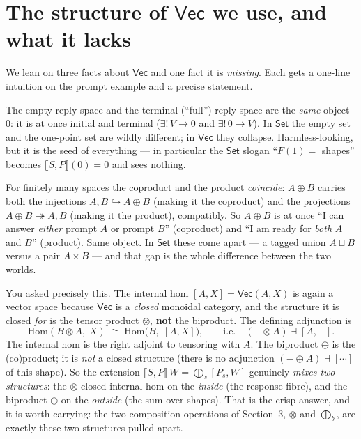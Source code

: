 \documentclass[11pt]{article}
\providecommand{\Vec}{}\renewcommand{\Vec}{\mathsf{Vec}}
\newcommand{\Set}{\mathsf{Set}}
\newcommand{\Hom}{\mathrm{Hom}}
\newcommand{\ext}[1]{\llbracket #1 \rrbracket}
\newcommand{\ihom}[2]{[#1,#2]}
\begin{document}
\section{The structure of $\Vec$ we use, and what it lacks}

We lean on three facts about $\Vec$ and one fact it is \emph{missing}. Each gets a
one-line intuition on the prompt example and a precise statement.

\begin{description}[leftmargin=1.3em,style=nextline]
\item[The zero object.] The empty reply space and the terminal (``full'') reply space
  are the \emph{same} object $0$: it is at once initial and terminal
  ($\exists!\,V\to 0$ and $\exists!\,0\to V$). In $\Set$ the empty set and the
  one-point set are wildly different; in $\Vec$ they collapse. Harmless-looking, but
  it is the seed of everything --- in particular the $\Set$ slogan ``$F(1)=$ shapes''
  becomes $\ext{S,P}(0)=0$ and sees nothing.

\item[The biproduct $A\oplus B$ --- the cleanest hook.] For finitely many spaces the
  coproduct and the product \emph{coincide}: $A\oplus B$ carries both the injections
  $A,B\hookrightarrow A\oplus B$ (making it the coproduct) and the projections
  $A\oplus B\twoheadrightarrow A,B$ (making it the product), compatibly. So $A\oplus B$
  is at once ``I can answer \emph{either} prompt $A$ or prompt $B$'' (coproduct) and
  ``I am ready for \emph{both} $A$ and $B$'' (product). Same object. In $\Set$ these
  come apart --- a tagged union $A\sqcup B$ versus a pair $A\times B$ --- and that gap
  is the whole difference between the two worlds.

\item[(B) $\Vec$ is closed --- with respect to $\otimes$, not $\oplus$.] You asked
  precisely this. The internal hom $\ihom{A}{X}=\Vec(A,X)$ is again a vector space
  because $\Vec$ is a \emph{closed} monoidal category, and the structure it is closed
  \emph{for} is the tensor product $\otimes$, \textbf{not} the biproduct. The defining
  adjunction is
  \[
    \Hom(B\otimes A,\;X)\;\cong\;\Hom\bigl(B,\;\ihom{A}{X}\bigr),
    \qquad\text{i.e.}\quad (-\otimes A)\dashv \ihom{A}{-}.
  \]
  The internal hom is the right adjoint to tensoring with $A$. The biproduct $\oplus$
  is the (co)product; it is \emph{not} a closed structure (there is no adjunction
  $(-\oplus A)\dashv[\cdots]$ of this shape). So the extension
  $\ext{S,P}\,W=\bigoplus_s\ihom{P_s}{W}$ genuinely \emph{mixes two structures}: the
  $\otimes$-closed internal hom on the \emph{inside} (the response fibre), and the
  biproduct $\oplus$ on the \emph{outside} (the sum over shapes). That is the crisp
  answer, and it is worth carrying: the two composition operations of Section~3,
  $\otimes$ and $\bigoplus_b$, are exactly these two structures pulled apart.


\end{description}
\end{document}
